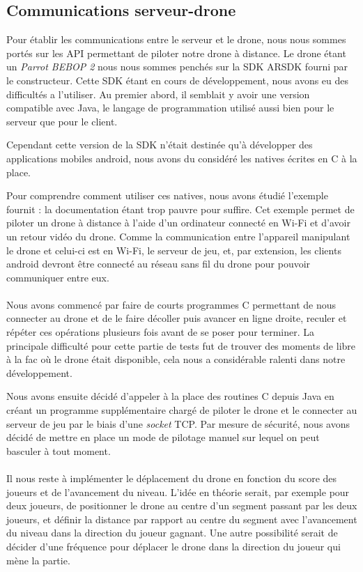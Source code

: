 \subsection{Communications serveur-drone}
Pour établir les communications entre le serveur et le drone, nous nous sommes portés sur les API permettant de piloter notre drone à distance. Le drone étant un \textit{Parrot BEBOP 2} nous nous sommes penchés sur la SDK ARSDK fourni par le constructeur. Cette SDK étant en cours de développement, nous avons eu des difficultés a l'utiliser. Au premier abord, il semblait y avoir une version compatible avec Java, le langage de programmation utilisé aussi bien pour le serveur que pour le client.

Cependant cette version de la SDK n'était destinée qu'à développer des applications mobiles android, nous avons du considéré les natives écrites en C à la place.

Pour comprendre comment utiliser ces natives, nous avons étudié l'exemple fournit : la documentation étant trop pauvre pour suffire. Cet exemple permet de piloter un drone à distance à l'aide d'un ordinateur connecté en Wi-Fi et d'avoir un retour vidéo du drone. Comme la communication entre l'appareil manipulant le drone et celui-ci est en Wi-Fi, le serveur de jeu, et, par extension, les clients android devront être connecté au réseau sans fil du drone  pour pouvoir communiquer entre eux.

\paragraph{}
Nous avons commencé par faire de courts programmes C permettant de nous connecter au drone et de le faire décoller puis avancer en ligne droite, reculer et répéter ces opérations plusieurs fois avant de se poser pour terminer. La principale difficulté pour cette partie de tests fut de trouver des moments de libre à la fac où le drone était disponible, cela nous a considérable ralenti dans notre développement.

Nous avons ensuite décidé d'appeler à la place des routines C depuis Java en créant un programme supplémentaire chargé de piloter le drone et le connecter au serveur de jeu par le biais d'une \textit{socket} TCP.
Par mesure de sécurité, nous avons décidé de mettre en place un mode de pilotage manuel sur lequel on peut basculer à tout moment.

\paragraph{}
Il nous reste à implémenter le déplacement du drone en fonction du score des joueurs et de l'avancement du niveau. L'idée en théorie serait, par exemple pour deux joueurs, de positionner le drone au centre d'un segment passant par les deux joueurs, et définir la distance par rapport au centre du segment avec l'avancement du niveau dans la direction du joueur gagnant.
Une autre possibilité serait de décider d'une fréquence pour déplacer le drone dans la direction du joueur qui mène la partie.

